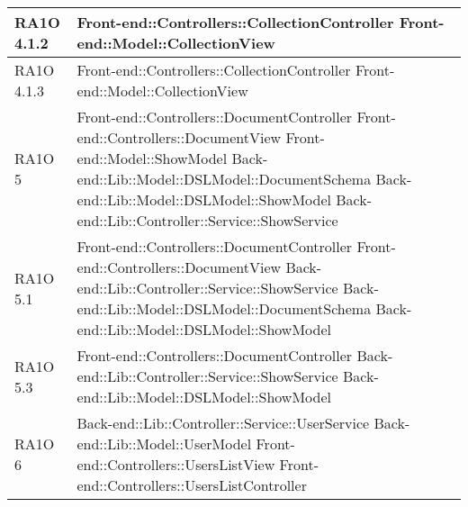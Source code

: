 \begin{center}
\begin{longtable}{ | p{3cm} | p{11cm} | }
	RA1O 4.1.2 & Front-end::Controllers::CollectionController \newline 
    Front-end::Model::CollectionView \newline  \\ \hline 
    
    RA1O 4.1.3 & Front-end::Controllers::CollectionController \newline 
    Front-end::Model::CollectionView \newline  \\ \hline 	
	         
    RA1O 5 & Front-end::Controllers::DocumentController \newline
   				 Front-end::Controllers::DocumentView \newline
    			 Front-end::Model::ShowModel \newline
    			 Back-end::Lib::Model::DSLModel::DocumentSchema \newline
    			 Back-end::Lib::Model::DSLModel::ShowModel \newline
    			 Back-end::Lib::Controller::Service::ShowService \newline  \\ \hline   
    			  
    RA1O 5.1 & Front-end::Controllers::DocumentController \newline
 				 Front-end::Controllers::DocumentView \newline
   				Back-end::Lib::Controller::Service::ShowService \newline
    			Back-end::Lib::Model::DSLModel::DocumentSchema \newline 
    			Back-end::Lib::Model::DSLModel::ShowModel \\ \hline
    			   
    RA1O 5.3 &
    			Front-end::Controllers::DocumentController \newline
    			Back-end::Lib::Controller::Service::ShowService \newline
    			Back-end::Lib::Model::DSLModel::ShowModel \newline \\ \hline      
    
    RA1O 6 & Back-end::Lib::Controller::Service::UserService \newline  
    			Back-end::Lib::Model::UserModel \newline 
    			Front-end::Controllers::UsersListView \newline 
    			Front-end::Controllers::UsersListController  \\ \hline  
        

\end{longtable}
\end{center}
